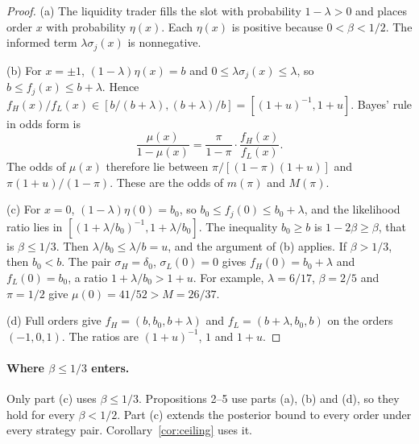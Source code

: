 \documentclass[11pt]{article}
\theoremstyle{definition}
\begin{document}
\begin{proof}
(a) The liquidity trader fills the slot with probability $1-\lambda>0$ and places order $x$ with probability
$\eta(x)$. Each $\eta(x)$ is positive because $0<\beta<1/2$. The informed term $\lambda\sigma_j(x)$ is nonnegative.

(b) For $x=\pm1$, $(1-\lambda)\eta(x)=b$ and $0\le\lambda\sigma_j(x)\le\lambda$, so $b\le f_j(x)\le b+\lambda$.
Hence $f_H(x)/f_L(x)\in[b/(b+\lambda),(b+\lambda)/b]=[(1+u)^{-1},1+u]$. Bayes' rule in odds form is
\[
\frac{\mu(x)}{1-\mu(x)}=\frac{\pi}{1-\pi}\cdot\frac{f_H(x)}{f_L(x)}.
\]
The odds of $\mu(x)$ therefore lie between $\pi/[(1-\pi)(1+u)]$ and $\pi(1+u)/(1-\pi)$. These are the odds of
$m(\pi)$ and $M(\pi)$.

(c) For $x=0$, $(1-\lambda)\eta(0)=b_0$, so $b_0\le f_j(0)\le b_0+\lambda$, and the likelihood ratio lies in
$[(1+\lambda/b_0)^{-1},1+\lambda/b_0]$. The inequality $b_0\ge b$ is $1-2\beta\ge\beta$, that is $\beta\le1/3$.
Then $\lambda/b_0\le\lambda/b=u$, and the argument of (b) applies. If $\beta>1/3$, then $b_0<b$. The pair
$\sigma_H=\delta_0$, $\sigma_L(0)=0$ gives $f_H(0)=b_0+\lambda$ and $f_L(0)=b_0$, a ratio $1+\lambda/b_0>1+u$.
For example, $\lambda=6/17$, $\beta=2/5$ and $\pi=1/2$ give $\mu(0)=41/52>M=26/37$.

(d) Full orders give $f_H=(b,b_0,b+\lambda)$ and $f_L=(b+\lambda,b_0,b)$ on the orders $(-1,0,1)$.
The ratios are $(1+u)^{-1}$, $1$ and $1+u$.
\end{proof}

\paragraph{Where $\beta\le 1/3$ enters.} Only part (c) uses $\beta\le1/3$. Propositions 2--5 use parts (a), (b)
and (d), so they hold for every $\beta<1/2$. Part (c) extends the posterior bound to every order under every
strategy pair. Corollary~\ref{cor:ceiling} uses it.
\end{document}
